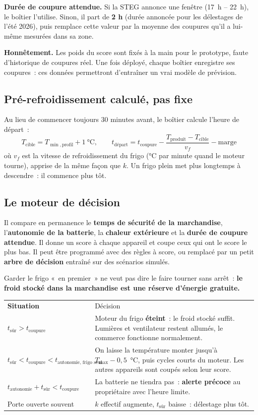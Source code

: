 \documentclass[10pt,a4paper]{article}
\begin{document}
\textbf{Durée de coupure attendue.} Si la STEG annonce une fenêtre (17~h -- 22~h), le boîtier l'utilise. Sinon, il part de \textbf{2 h} (durée annoncée pour les délestages de l'été 2026), puis remplace cette valeur par la moyenne des coupures qu'il a lui-même mesurées dans sa zone.

\textbf{Honnêtement.} Les poids du score sont fixés à la main pour le prototype, faute d'historique de coupures réel. Une fois déployé, chaque boîtier enregistre ses coupures~: ces données permettront d'entraîner un vrai modèle de prévision.

\subsection{Pré-refroidissement calculé, pas fixe}
Au lieu de commencer toujours 30 minutes avant, le boîtier calcule l'heure de départ~:
\[ T_{\text{cible}} = T_{\min,\text{profil}} + 1\ \text{°C}, \qquad t_{\text{départ}} = t_{\text{coupure}} - \frac{T_{\text{produit}} - T_{\text{cible}}}{v_f} - \text{marge} \]
où $v_f$ est la vitesse de refroidissement du frigo (°C par minute quand le moteur tourne), apprise de la même façon que $k$. Un frigo plein met plus longtemps à descendre~: il commence plus tôt.

\subsection{Le moteur de décision}
Il compare en permanence le \textbf{temps de sécurité de la marchandise}, l'\textbf{autonomie de la batterie}, la \textbf{chaleur extérieure} et la \textbf{durée de coupure attendue}. Il donne un score à chaque appareil et coupe ceux qui ont le score le plus bas. Il peut être programmé avec des règles à score, ou remplacé par un petit \textbf{arbre de décision} entraîné sur des scénarios simulés.

Garder le frigo «~en premier~» ne veut pas dire le faire tourner sans arrêt~: \textbf{le froid stocké dans la marchandise est une réserve d'énergie gratuite.}

\begin{tabularx}{\linewidth}{P{5.2cm}L}
 \textbf{Situation} & Décision \\
$t_{\text{sûr}} > t_{\text{coupure}}$ & Moteur du frigo \textbf{éteint}~: le froid stocké suffit. Lumières et ventilateur restent allumés, le commerce fonctionne normalement. \\
$t_{\text{sûr}} < t_{\text{coupure}} < t_{\text{autonomie, frigo seul}}$ & On laisse la température monter jusqu'à $T_{\max} - 0{,}5$~°C, puis cycles courts du moteur. Les autres appareils sont coupés selon leur score. \\
$t_{\text{autonomie}} + t_{\text{sûr}} < t_{\text{coupure}}$ & La batterie ne tiendra pas~: \textbf{alerte précoce} au propriétaire avec l'heure limite. \\
Porte ouverte souvent & $k$ effectif augmente, $t_{\text{sûr}}$ baisse~: délestage plus tôt. \\
\end{tabularx}
\end{document}
